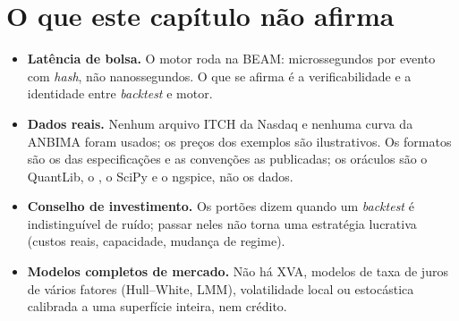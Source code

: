 \section{O que este capítulo não afirma}\label{sec:fin-limites}

\begin{itemize}
  \item \textbf{Latência de bolsa.} O motor roda na BEAM: microssegundos por evento com \textit{hash}, não nanossegundos. O que se afirma é a verificabilidade e a identidade entre \textit{backtest} e motor.
  \item \textbf{Dados reais.} Nenhum arquivo ITCH da Nasdaq e nenhuma curva da ANBIMA foram usados; os preços dos exemplos são ilustrativos. Os formatos são os das especificações e as convenções as publicadas; os oráculos são o QuantLib, o , o SciPy e o ngspice, não os dados.
  \item \textbf{Conselho de investimento.} Os portões dizem quando um \textit{backtest} é indistinguível de ruído; passar neles não torna uma estratégia lucrativa (custos reais, capacidade, mudança de regime).
  \item \textbf{Modelos completos de mercado.} Não há XVA, modelos de taxa de juros de vários fatores (Hull--White, LMM), volatilidade local ou estocástica calibrada a uma superfície inteira, nem crédito.
\end{itemize}
